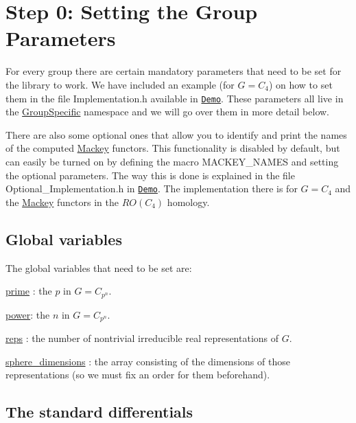 \hypertarget{use_how}{}\section{Step 0\+: Setting the Group Parameters}\label{use_how}

\begin{DoxyItemize}
\item For every group there are certain mandatory parameters that need to be set for the library to work. We have included an example (for $G=C_4$) on how to set them in the file Implementation.\+h available in \href{https://github.com/NickG-Math/Mackey/Demo}{\tt Demo}. These parameters all live in the \hyperlink{namespaceGroupSpecific}{Group\+Specific} namespace and we will go over them in more detail below.
\item There are also some optional ones that allow you to identify and print the names of the computed \hyperlink{namespaceMackey}{Mackey} functors. This functionality is disabled by default, but can easily be turned on by defining the macro {\ttfamily M\+A\+C\+K\+E\+Y\+\_\+\+N\+A\+M\+ES} and setting the optional parameters. The way this is done is explained in the file Optional\+\_\+\+Implementation.\+h in \href{https://github.com/NickG-Math/Mackey/Demo}{\tt Demo}. The implementation there is for $G=C_4$ and the \hyperlink{namespaceMackey}{Mackey} functors in the $RO(C_4)$ homology.
\end{DoxyItemize}\hypertarget{use_var}{}\subsection{Global variables}\label{use_var}
The global variables that need to be set are\+:


\begin{DoxyItemize}
\item \hyperlink{classGroupSpecific_1_1Variables_a38586ec998bcbfdf325e6cfc6598b54b}{prime} \+: the $p$ in $G=C_{p^n}$.
\item \hyperlink{classGroupSpecific_1_1Variables_ac9bd6be19cc41e6877ee25a2d1c7be80}{power}\+: the $n$ in $G=C_{p^n}$.
\item \hyperlink{classGroupSpecific_1_1Variables_a5504789b0b60050e6ea223fdeb84874a}{reps} \+: the number of nontrivial irreducible real representations of $G$.
\item \hyperlink{classGroupSpecific_1_1Variables_a4746f16736abcf4c705dd8690ec12ca0}{sphere\+\_\+dimensions} \+: the array consisting of the dimensions of those representations (so we must fix an order for them beforehand).
\end{DoxyItemize}\hypertarget{use_fun}{}\subsection{The standard differentials}\label{use_fun}

